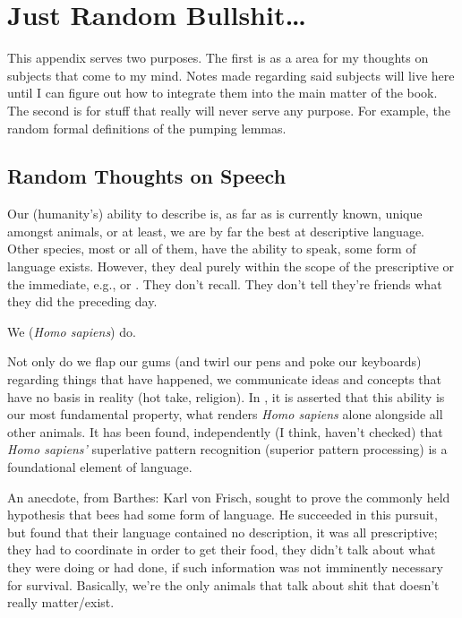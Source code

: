 \documentclass[../butidigress.tex]{subfiles}
\begin{document}
\chapter{Just Random Bullshit\ldots}
\newpage

This appendix serves two purposes.
The first is as a area for my thoughts on subjects that come to my mind.
Notes made regarding said subjects will live here until I can figure out how to integrate them into the main matter of the book.
The second is for stuff that really will never serve any purpose.
For example, the random formal definitions of the pumping lemmas.

\section{Random Thoughts on Speech}
Our (humanity's) ability to describe is, as far as is currently known, unique amongst animals, or at least, we are by far the best at descriptive language.
Other species, most or all of them, have the ability to speak, some form of language exists.
However, they deal purely within the scope of the prescriptive or the immediate, e.g.,  or .
They don't recall.
They don't tell they're friends what they did the preceding day.

We (\textit{Homo sapiens}) do.

Not only do we flap our gums (and twirl our pens and poke our keyboards) regarding things that have happened, we communicate ideas and concepts that have no basis in reality (hot take, religion). In , it is asserted that this ability is our most fundamental property, what renders \emph{Homo sapiens} alone alongside all other animals\autocite{sapiens}.
It has been found, independently (I think, haven't checked) that \emph{Homo sapiens'} superlative pattern recognition (superior pattern processing) is a foundational element of language.

An anecdote, from Barthes: Karl von Frisch, sought to prove the commonly held hypothesis that bees had some form of language.
He succeeded in this pursuit, but found that their language contained no description, it was all prescriptive; they had to coordinate in order to get their food, they didn't talk about what they were doing or had done, if such information was not imminently necessary for survival.
Basically, we're the only animals that talk about shit that doesn't really matter/exist.
\end{document}
